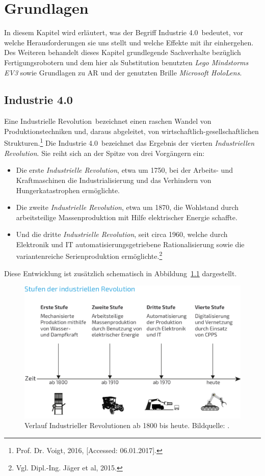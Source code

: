 \chapter{Grundlagen}\label{chapter:Grundlagen}
In diesem Kapitel wird erläutert, was der Begriff \frqq Industrie 4.0\flqq\  bedeutet, vor welche Herausforderungen sie uns stellt und welche Effekte mit ihr einhergehen. Des Weiteren behandelt dieses Kapitel grundlegende Sachverhalte bezüglich Fertigungsrobotern und dem hier als Substitution benutzten  \textit{Lego Mindstorms EV3} sowie Grundlagen zu AR und der genutzten Brille \textit{Microsoft HoloLens}.
\section{Industrie 4.0}\label{sec:i40}
Eine \frqq Industrielle Revolution\flqq\ bezeichnet \frqq einen raschen Wandel von Produktionstechniken und, daraus abgeleitet, von wirtschaftlich-gesellschaftlichen Strukturen.\flqq\footnote{ Prof. Dr. Voigt, 2016, [Accessed: 06.01.2017].} Die \frqq Industrie 4.0\flqq\ bezeichnet das Ergebnis der vierten \textit{Industriellen Revolution}. Sie reiht sich an der Spitze von drei Vorgängern ein:
\begin{itemize}
	\item Die erste \textit{Industrielle Revolution}, etwa um 1750, bei der Arbeits- und Kraftmaschinen die Industrialisierung und das Verhindern von Hungerkatastrophen ermöglichte.
	\item Die zweite \textit{Industrielle Revolution}, etwa um 1870, die Wohlstand durch arbeitsteilige Massenproduktion mit Hilfe elektrischer Energie schaffte.
	\item Und die dritte \textit{Industrielle Revolution}, seit circa 1960, welche durch Elektronik und IT automatisierungsgetriebene Rationalisierung sowie die variantenreiche Serienproduktion ermöglichte.\footnote{ Vgl. Dipl.-Ing. Jäger et al, 2015.}
\end{itemize}
Diese Entwicklung ist zusätzlich schematisch in Abbildung~\ref{fig:VerlaufIndustrie402} dargestellt.
\begin{figure}[ht]
	\centering
	\includegraphics[width=.8\textwidth]{figuren/Industrie-40-Definition-Stufen-Revolution-01}
	\caption{Verlauf Industrieller Revolutionen ab 1800 bis heute. Bildquelle: \cite{i40Verlauf}.}
	\label{fig:VerlaufIndustrie402}
\end{figure}
